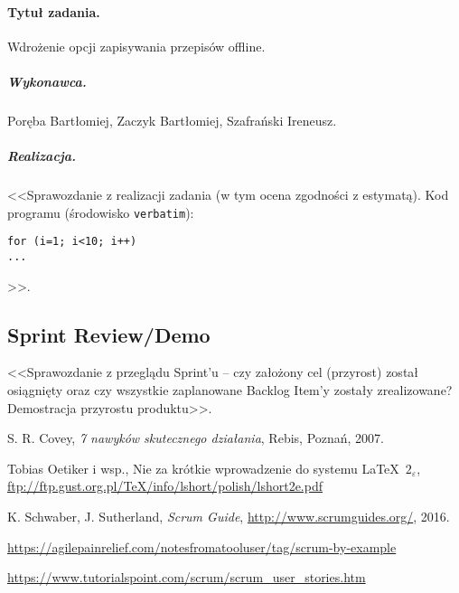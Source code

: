 \documentclass[a4paper]{article}
\begin{document}
\paragraph{Tytuł zadania.} Wdrożenie opcji zapisywania przepisów offline.
\subparagraph{Wykonawca.} Poręba Bartłomiej, Zaczyk Bartłomiej, Szafrański Ireneusz.
\subparagraph{Realizacja.} <<Sprawozdanie z realizacji zadania (w tym ocena zgodności z estymatą). Kod programu (środowisko \texttt{verbatim}): \begin{verbatim}
for (i=1; i<10; i++)
...
\end{verbatim}>>.


\subsection{Sprint Review/Demo}
<<Sprawozdanie z przeglądu Sprint'u -- czy założony cel (przyrost) został osiągnięty oraz czy wszystkie zaplanowane Backlog Item'y zostały zrealizowane? Demostracja przyrostu produktu>>.



\begin{thebibliography}{9}

 S. R. Covey, {\em 7 nawyków skutecznego działania}, Rebis, Poznań, 2007.

 Tobias Oetiker i wsp., Nie za krótkie wprowadzenie do systemu \LaTeX  \ $2_\varepsilon$, \url{ftp://ftp.gust.org.pl/TeX/info/lshort/polish/lshort2e.pdf}

 K. Schwaber, J. Sutherland, {\em Scrum Guide}, \url{http://www.scrumguides.org/}, 2016.

 \url{https://agilepainrelief.com/notesfromatooluser/tag/scrum-by-example}

 \url{https://www.tutorialspoint.com/scrum/scrum_user_stories.htm}

\end{thebibliography}
\end{document}
